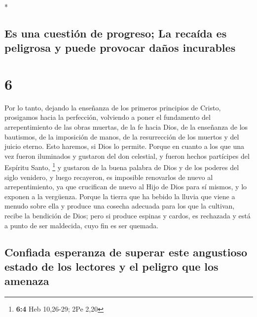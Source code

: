 \begin{paracol}{2}
\begin{otherlanguage}{english}
\end{otherlanguage}

\switchcolumn[0]*

\hypertarget{es-una-cuestiuxf3n-de-progreso-la-recauxedda-es-peligrosa-y-puede-provocar-dauxf1os-incurables}{%
\subsection{Es una cuestión de progreso; La recaída es peligrosa y puede
provocar daños
incurables}\label{es-una-cuestiuxf3n-de-progreso-la-recauxedda-es-peligrosa-y-puede-provocar-dauxf1os-incurables}}

\hypertarget{section-10}{%
\section{6}\label{section-10}}

 Por lo tanto, dejando la enseñanza de los primeros
principios de Cristo, prosigamos hacia la perfección, volviendo a poner
el fundamento del arrepentimiento de las obras muertas, de la fe hacia
Dios,  de la enseñanza de los bautismos, de la imposición
de manos, de la resurrección de los muertos y del juicio eterno.
 Esto haremos, si Dios lo permite.  Porque
en cuanto a los que una vez fueron iluminados y gustaron del don
celestial, y fueron hechos partícipes del Espíritu Santo, \footnote{\textbf{6:4}
  Heb 10,26-29; 2Pe 2,20}  y gustaron de la buena palabra
de Dios y de los poderes del siglo venidero,  y luego
recayeron, es imposible renovarlos de nuevo al arrepentimiento, ya que
crucifican de nuevo al Hijo de Dios para sí mismos, y lo exponen a la
vergüenza.  Porque la tierra que ha bebido la lluvia que
viene a menudo sobre ella y produce una cosecha adecuada para los que la
cultivan, recibe la bendición de Dios;  pero si produce
espinas y cardos, es rechazada y está a punto de ser maldecida, cuyo fin
es ser quemada.

\hypertarget{confiada-esperanza-de-superar-este-angustioso-estado-de-los-lectores-y-el-peligro-que-los-amenaza}{%
\subsection{Confiada esperanza de superar este angustioso estado de los
lectores y el peligro que los
amenaza}\label{confiada-esperanza-de-superar-este-angustioso-estado-de-los-lectores-y-el-peligro-que-los-amenaza}}


\end{paracol}
